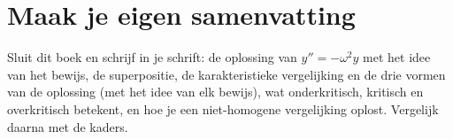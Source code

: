 
\begin{oefeningen}


\end{oefeningen}


\begin{oefeningen}





\end{oefeningen}


\ifzelfstudie
\section*{Maak je eigen samenvatting}
Sluit dit boek en schrijf in je schrift: de oplossing van $y'' = -\omega^2 y$ met het idee van het bewijs, de superpositie, de karakteristieke vergelijking en de drie vormen van de oplossing (met het idee van elk bewijs), wat onderkritisch, kritisch en overkritisch betekent, en hoe je een niet-homogene vergelijking oplost. Vergelijk daarna met de kaders.
\fi

